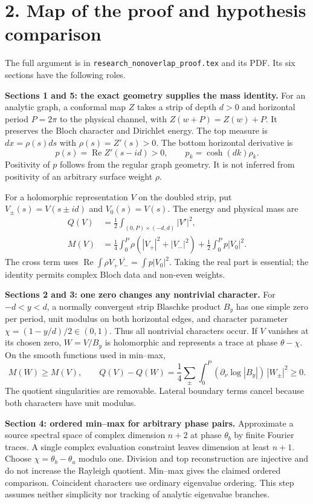 \documentclass[11pt]{article}
\begin{document}
\newpage
\section*{2. Map of the proof and hypothesis comparison}
The full argument is in \texttt{research\_nonoverlap\_proof.tex} and its PDF.
Its six sections have the following roles.

\textbf{Sections 1 and 5: the exact geometry supplies the mass identity.}
For an analytic graph, a conformal map $Z$ takes a strip of depth $d>0$
and horizontal period $P=2\pi$ to the physical channel, with
$Z(w+P)=Z(w)+P$. It preserves the Bloch character and Dirichlet energy.
The top measure is $dx=\rho(s)ds$ with $\rho(s)=Z'(s)>0$.
The bottom horizontal derivative is
\[
p(s)=\operatorname{Re}Z'(s-id)>0,\qquad p_k=\cosh(dk)\rho_k.
\]
Positivity of $p$ follows from the regular graph geometry. It is not
inferred from positivity of an arbitrary surface weight $\rho$.

For a holomorphic representation $V$ on the doubled strip, put
$V_\pm(s)=V(s\pm id)$ and $V_0(s)=V(s)$. The energy and physical mass are
\begin{align*}
Q(V)&=\frac12\int_{(0,P)\times(-d,d)}|V'|^2,\\
M(V)&=\frac14\int_0^P\rho(|V_+|^2+|V_-|^2)
       +\frac12\int_0^P p|V_0|^2.
\end{align*}
The cross term uses
$\operatorname{Re}\int\rho V_+\overline{V_-}=\int p|V_0|^2$.
Taking the real part is essential; the identity permits complex Bloch
data and non-even weights.

\textbf{Sections 2 and 3: one zero changes any nontrivial character.}
For $-d<y<d$, a normally convergent strip Blaschke product $B_y$ has one
simple zero per period, unit modulus on both horizontal edges, and
character parameter $\chi=(1-y/d)/2\in(0,1)$. Thus all nontrivial
characters occur. If $V$ vanishes at its chosen zero, $W=V/B_y$ is
holomorphic and represents a trace at phase $\theta-\chi$. On the
smooth functions used in min--max,
\[
M(W)\ge M(V),\qquad
Q(V)-Q(W)=\frac14\sum_{\pm}\int_0^P
   (\partial_\nu\log|B_y|)\,|W_\pm|^2\ge0.
\]
The quotient singularities are removable. Lateral boundary terms cancel
because both characters have unit modulus.

\textbf{Section 4: ordered min--max for arbitrary phase pairs.}
Approximate a source spectral space of complex dimension $n+2$ at phase
$\theta_b$ by finite Fourier traces. A single complex evaluation constraint
leaves dimension at least $n+1$. Choose $\chi=\theta_b-\theta_a$ modulo
one. Division and top reconstruction are injective and do not increase
the Rayleigh quotient. Min--max gives the claimed ordered comparison.
Coincident characters use ordinary eigenvalue ordering. This step assumes
neither simplicity nor tracking of analytic eigenvalue branches.
\end{document}
